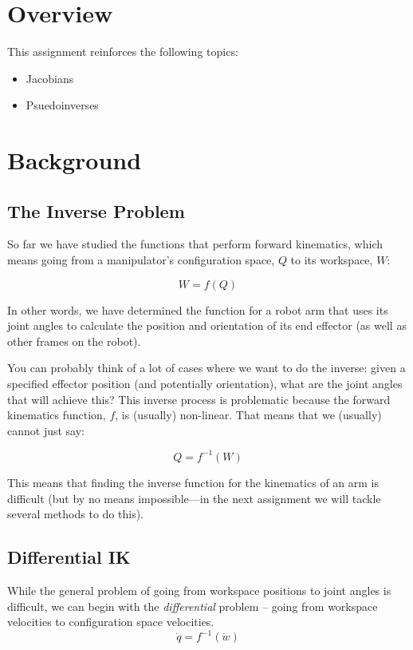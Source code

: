 \documentclass{16384_doc}
\begin{document}
\maketitle

\tableofcontents

\section{Overview}
This assignment reinforces the following topics:
\begin{itemize}

\item Jacobians
\item Psuedoinverses

\end{itemize}

\section{Background}

\subsection{The Inverse Problem}
So far we have studied the functions that perform forward kinematics, which
means going from a manipulator's configuration space, $Q$ to its workspace, $W$:

\[
W = f(Q)
\]

\noindent In other words, we have determined the function for a robot arm that uses its
joint angles to calculate the position and orientation of its end effector (as
well as other frames on the robot).

You can probably think of a lot of cases where we want to do the inverse: given
a specified effector position (and potentially orientation), what are the joint
angles that will achieve this?  This inverse process is problematic because the
forward kinematics function, $f$, is (usually) non-linear.  That means that we
(usually) cannot just say:

\[
Q = f^{-1}(W)
\]

This means that finding the inverse function for the kinematics of an arm is
difficult (but by no means impossible---in the next assignment we will
tackle several methods to do this).

\subsection{Differential IK}
While the general problem of going from workspace positions to joint angles is
difficult, we can begin with the \emph{differential} problem -- going from
workspace velocities to configuration space velocities.
\[
\dot q = f^{-1}(\dot w)
\]
\end{document}
